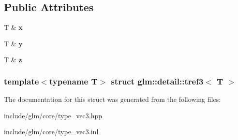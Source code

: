 \subsection*{\-Public \-Attributes}
\begin{DoxyCompactItemize}
\item 
\hypertarget{structglm_1_1detail_1_1tref3_a3f14a729db2070ddc283cb51a2f8b356}{\-T \& {\bfseries x}}\label{structglm_1_1detail_1_1tref3_a3f14a729db2070ddc283cb51a2f8b356}

\item 
\hypertarget{structglm_1_1detail_1_1tref3_a285fa0ec7ea9860e3f0a874214099515}{\-T \& {\bfseries y}}\label{structglm_1_1detail_1_1tref3_a285fa0ec7ea9860e3f0a874214099515}

\item 
\hypertarget{structglm_1_1detail_1_1tref3_ac35736fe6e6e035b8c0fcb8933de3b3c}{\-T \& {\bfseries z}}\label{structglm_1_1detail_1_1tref3_ac35736fe6e6e035b8c0fcb8933de3b3c}

\end{DoxyCompactItemize}
\subsubsection*{template$<$typename \-T$>$ struct glm\-::detail\-::tref3$<$ T $>$}



\-The documentation for this struct was generated from the following files\-:\begin{DoxyCompactItemize}
\item 
include/glm/core/\hyperlink{type__vec3_8hpp}{type\-\_\-vec3.\-hpp}\item 
include/glm/core/type\-\_\-vec3.\-inl\end{DoxyCompactItemize}
